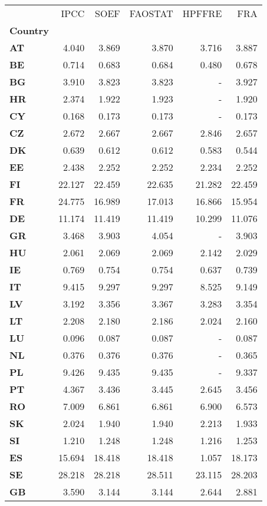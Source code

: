 \begin{tabular}{lrrrrr}
\toprule
{} &   IPCC &   SOEF &  FAOSTAT &  HPFFRE &    FRA \\
\textbf{Country} &        &        &          &         &        \\
\midrule
\textbf{AT     } &  4.040 &  3.869 &    3.870 &   3.716 &  3.887 \\
\textbf{BE     } &  0.714 &  0.683 &    0.684 &   0.480 &  0.678 \\
\textbf{BG     } &  3.910 &  3.823 &    3.823 &       - &  3.927 \\
\textbf{HR     } &  2.374 &  1.922 &    1.923 &       - &  1.920 \\
\textbf{CY     } &  0.168 &  0.173 &    0.173 &       - &  0.173 \\
\textbf{CZ     } &  2.672 &  2.667 &    2.667 &   2.846 &  2.657 \\
\textbf{DK     } &  0.639 &  0.612 &    0.612 &   0.583 &  0.544 \\
\textbf{EE     } &  2.438 &  2.252 &    2.252 &   2.234 &  2.252 \\
\textbf{FI     } & 22.127 & 22.459 &   22.635 &  21.282 & 22.459 \\
\textbf{FR     } & 24.775 & 16.989 &   17.013 &  16.866 & 15.954 \\
\textbf{DE     } & 11.174 & 11.419 &   11.419 &  10.299 & 11.076 \\
\textbf{GR     } &  3.468 &  3.903 &    4.054 &       - &  3.903 \\
\textbf{HU     } &  2.061 &  2.069 &    2.069 &   2.142 &  2.029 \\
\textbf{IE     } &  0.769 &  0.754 &    0.754 &   0.637 &  0.739 \\
\textbf{IT     } &  9.415 &  9.297 &    9.297 &   8.525 &  9.149 \\
\textbf{LV     } &  3.192 &  3.356 &    3.367 &   3.283 &  3.354 \\
\textbf{LT     } &  2.208 &  2.180 &    2.186 &   2.024 &  2.160 \\
\textbf{LU     } &  0.096 &  0.087 &    0.087 &       - &  0.087 \\
\textbf{NL     } &  0.376 &  0.376 &    0.376 &       - &  0.365 \\
\textbf{PL     } &  9.426 &  9.435 &    9.435 &       - &  9.337 \\
\textbf{PT     } &  4.367 &  3.436 &    3.445 &   2.645 &  3.456 \\
\textbf{RO     } &  7.009 &  6.861 &    6.861 &   6.900 &  6.573 \\
\textbf{SK     } &  2.024 &  1.940 &    1.940 &   2.213 &  1.933 \\
\textbf{SI     } &  1.210 &  1.248 &    1.248 &   1.216 &  1.253 \\
\textbf{ES     } & 15.694 & 18.418 &   18.418 &   1.057 & 18.173 \\
\textbf{SE     } & 28.218 & 28.218 &   28.511 &  23.115 & 28.203 \\
\textbf{GB     } &  3.590 &  3.144 &    3.144 &   2.644 &  2.881 \\
\bottomrule
\end{tabular}
